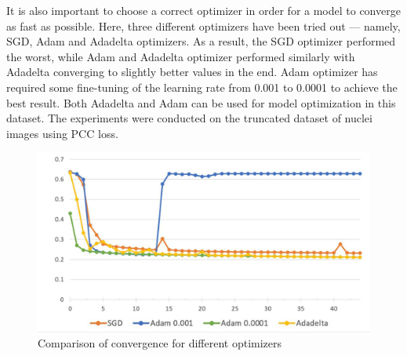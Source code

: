 It is also important to choose a correct optimizer in order for a model to converge as fast as possible. Here, three different optimizers have been tried out --- namely, SGD, Adam and Adadelta optimizers. As a result, the SGD optimizer performed the worst, while Adam and Adadelta optimizer performed similarly with Adadelta converging to slightly better values in the end. Adam optimizer has required some fine-tuning of the learning rate from 0.001 to 0.0001 to achieve the best result. Both Adadelta and Adam can be used for model optimization in this dataset. The experiments were conducted on the truncated dataset of nuclei images using PCC loss.

\begin{figure}[H]
	\begin{center}
		\includegraphics[width=0.8\linewidth]{bilder/model training/optimizer-comparison.png}
		\caption{Comparison of convergence for different optimizers}\label{fig:optimizers}
	\end{center}
\end{figure}

